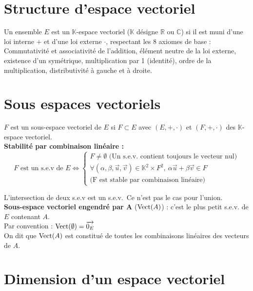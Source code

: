 \section{Structure d'espace vectoriel}\label{sec:structure-d'espace-vectoriel}
  
  Un ensemble $E$ est un $\mathbb K$-espace vectoriel ($\mathbb K$ désigne $\mathbb{R}$ ou $\mathbb{C}$) si il est muni d'une loi interne $\textbf{+}$ et d'une loi externe \textbf{$\cdot$}, respectant les 8 axiomes de base :\\
  Commutativité et associativité de l'addition, élément neutre de la loi externe, existence d'un symétrique, multiplication par 1 (identité), ordre de la multiplication, distributivité à gauche et à droite.


\section{Sous espaces vectoriels}\label{sec:sous-espaces-vectoriels}
  
  $F$ est un sous-espace vectoriel de $E$ si $F \subset E$ avec $(E, +, \cdot)$ et $(F, +, \cdot)$ des $\mathbb K$-espace vectoriel.\\
  
  \textbf{Stabilité par combinaison linéaire :}
  \begin{equation}
    F \text{ est un s.e.v de } E \iff
    \begin{cases}
      F \neq \emptyset \text{ (Un s.e.v. contient toujours le vecteur nul)}\\
      \forall (\alpha, \beta, \vec u, \vec v) \in \mathbb{K}^2 \times F^2,\ \alpha \vec u + \beta \vec v \in F\\
      \text{(F est stable par combinaison linéaire)}
    \end{cases}\label{eq:equation2}
  \end{equation}
  
  L'intersection de deux s.e.v est un s.e.v.\ Ce n'est pas le cas pour l'union.\\
  
  \textbf{Sous-espace vectoriel engendré par A} ($\operatorname{Vect}(A)$) : c'est le plus petit s.e.v. de $E$ contenant $A$.\\
  Par convention : $\operatorname{Vect}(\emptyset) = {\overrightarrow{0_E}}$\\
  On dit que $\operatorname{Vect}(A)$ est constitué de toutes les combinaisons linéaires des vecteurs de $A$.


\section{Dimension d'un espace vectoriel}\label{sec:dimension-d'un-espace-vectoriel}
  
